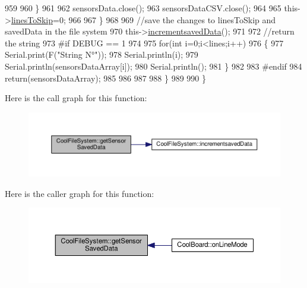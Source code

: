 \begin{DoxyCode}
959 
960             \}
961 
962             sensorsData.close();
963             sensorsDataCSV.close();
964             
965             this->\hyperlink{class_cool_file_system_a84fdb6057e534b395512463daa28ea3c}{linesToSkip}=0;
966         
967         \}
968 
969         \textcolor{comment}{//save the changes to linesToSkip and savedData in the file system}
970         this->\hyperlink{class_cool_file_system_aae045125288f255f3e258073dcada2a6}{incrementsavedData}();
971 
972         \textcolor{comment}{//return the string}
973 \textcolor{preprocessor}{        #if DEBUG == 1}
974         
975             \textcolor{keywordflow}{for}(\textcolor{keywordtype}{int} i=0;i<lines;i++)
976             \{
977                 Serial.print(F(\textcolor{stringliteral}{"String N°"}));
978                 Serial.println(i);
979                 Serial.println(sensorsDataArray[i]);
980                 Serial.println();           
981             \}
982     
983 \textcolor{preprocessor}{        #endif}
984         \textcolor{keywordflow}{return}(sensorsDataArray);
985         
986         
987         
988     \}
989 
990 \}
\end{DoxyCode}
Here is the call graph for this function\+:\nopagebreak
\begin{figure}[H]
\begin{center}
\leavevmode
\includegraphics[width=350pt]{db/d0c/class_cool_file_system_a3223ffff4266a6300988fab956d6b4b2_cgraph}
\end{center}
\end{figure}
Here is the caller graph for this function\+:\nopagebreak
\begin{figure}[H]
\begin{center}
\leavevmode
\includegraphics[width=350pt]{db/d0c/class_cool_file_system_a3223ffff4266a6300988fab956d6b4b2_icgraph}
\end{center}
\end{figure}
\mbox{\label{class_cool_file_system_aae045125288f255f3e258073dcada2a6}} 
